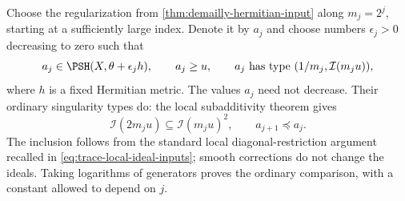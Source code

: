Choose the regularization from \cref{thm:demailly-hermitian-input} along $m_j=2^j$, starting at a sufficiently large index. Denote it by $a_j$ and choose numbers $\epsilon_j>0$ decreasing to zero such that
\begin{equation}\label{eq:dyadic-analytic-backgrounds}
 a_j\in\PSH(X,\theta+\epsilon_jh),\qquad
 a_j\geq u,\qquad
 a_j\text{ has type }(1/m_j,\mathcal I(m_ju)),
\end{equation}
where $h$ is a fixed Hermitian metric. The values $a_j$ need not decrease. Their ordinary singularity types do: the local subadditivity theorem gives
\[
 \mathcal I(2m_ju)\subseteq\mathcal I(m_ju)^2,
 \qquad a_{j+1}\preceq a_j.
\]
The inclusion follows from the standard local diagonal-restriction argument recalled in \eqref{eq:trace-local-ideal-inputs}; smooth corrections do not change the ideals. Taking logarithms of generators proves the ordinary comparison, with a constant allowed to depend on $j$.

